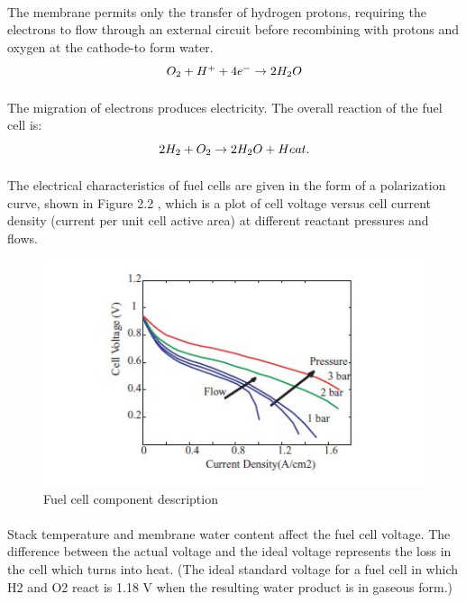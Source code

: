 \paragraph{}The membrane permits only the transfer of  hydrogen protons, requiring the electrons to flow through an external circuit before recombining with protons and oxygen at the cathode-to form water.
\begin{equation}
$$O_{2}+H^{+} + 4e^{-}\rightarrow 2H_{2}O $$
\end{equation}
\paragraph{}The migration of electrons produces electricity. The overall reaction of the fuel cell is:
\begin{equation}
$$2H_{2}+ O_{2} \rightarrow 2H_{2}O+Heat.$$
\end{equation}
\paragraph{}The electrical characteristics of fuel cells are given in the form of a polarization curve, shown in Figure 2.2 , which is a plot of cell voltage versus cell current density (current per unit cell active area) at different reactant pressures and flows.
\begin{figure}[!h]
\includegraphics{Figures/Figure6}
\caption{Fuel cell component description
\cite{stefanopoulou_mechatronics_nodate}}
\end{figure}
\paragraph{}Stack temperature and membrane water content affect the fuel cell voltage. The difference between the actual voltage and the ideal voltage represents the loss in the cell which turns into heat. (The ideal standard voltage for a fuel cell in which H2 and O2 react is 1.18 V when the resulting water product is in gaseous form.)
